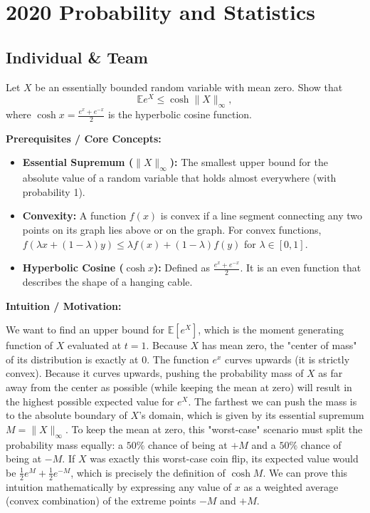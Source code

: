 \section{2020 Probability and Statistics}

\subsection{Individual \& Team}

\begin{exercise}\label{probability:2020:1}
Let $X$ be an essentially bounded random variable with mean zero. Show that
\[
\mathbb{E}e^X \leq \cosh\|X\|_\infty,
\]
where $\cosh x = \frac{e^x + e^{-x}}{2}$ is the hyperbolic cosine function.
\end{exercise}

\begin{solution}
\textbf{Prerequisites / Core Concepts:}
\begin{itemize}
    \item \textbf{Essential Supremum ($\|X\|_\infty$):} The smallest upper bound for the absolute value of a random variable that holds almost everywhere (with probability 1).
    \item \textbf{Convexity:} A function $f(x)$ is convex if a line segment connecting any two points on its graph lies above or on the graph. For convex functions, $f(\lambda x + (1-\lambda)y) \leq \lambda f(x) + (1-\lambda) f(y)$ for $\lambda \in [0, 1]$.
    \item \textbf{Hyperbolic Cosine ($\cosh x$):} Defined as $\frac{e^x + e^{-x}}{2}$. It is an even function that describes the shape of a hanging cable.
\end{itemize}

\textbf{Intuition / Motivation:}

We want to find an upper bound for $\mathbb{E}[e^X]$, which is the moment generating function of $X$ evaluated at $t=1$.
Because $X$ has mean zero, the "center of mass" of its distribution is exactly at 0.
The function $e^x$ curves upwards (it is strictly convex). Because it curves upwards, pushing the probability mass of $X$ as far away from the center as possible (while keeping the mean at zero) will result in the highest possible expected value for $e^X$.
The farthest we can push the mass is to the absolute boundary of $X$'s domain, which is given by its essential supremum $M = \|X\|_\infty$.
To keep the mean at zero, this "worst-case" scenario must split the probability mass equally: a $50\%$ chance of being at $+M$ and a $50\%$ chance of being at $-M$.
If $X$ was exactly this worst-case coin flip, its expected value would be $\frac{1}{2}e^M + \frac{1}{2}e^{-M}$, which is precisely the definition of $\cosh M$.
We can prove this intuition mathematically by expressing any value of $x$ as a weighted average (convex combination) of the extreme points $-M$ and $+M$.


\end{solution}
